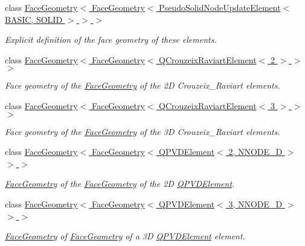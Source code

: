 \begin{DoxyCompactItemize}
\item 
class \hyperlink{classoomph_1_1FaceGeometry_3_01FaceGeometry_3_01PseudoSolidNodeUpdateElement_3_01BASIC_00_01SOLID_01_4_01_4_01_4}{Face\+Geometry$<$ Face\+Geometry$<$ Pseudo\+Solid\+Node\+Update\+Element$<$ B\+A\+S\+I\+C, S\+O\+L\+I\+D $>$ $>$ $>$}
\begin{DoxyCompactList}\small\item\em Explicit definition of the face geometry of these elements. \end{DoxyCompactList}\item 
class \hyperlink{classoomph_1_1FaceGeometry_3_01FaceGeometry_3_01QCrouzeixRaviartElement_3_012_01_4_01_4_01_4}{Face\+Geometry$<$ Face\+Geometry$<$ Q\+Crouzeix\+Raviart\+Element$<$ 2 $>$ $>$ $>$}
\begin{DoxyCompactList}\small\item\em Face geometry of the \hyperlink{classoomph_1_1FaceGeometry}{Face\+Geometry} of the 2D Crouzeix\+\_\+\+Raviart elements. \end{DoxyCompactList}\item 
class \hyperlink{classoomph_1_1FaceGeometry_3_01FaceGeometry_3_01QCrouzeixRaviartElement_3_013_01_4_01_4_01_4}{Face\+Geometry$<$ Face\+Geometry$<$ Q\+Crouzeix\+Raviart\+Element$<$ 3 $>$ $>$ $>$}
\begin{DoxyCompactList}\small\item\em Face geometry of the \hyperlink{classoomph_1_1FaceGeometry}{Face\+Geometry} of the 3D Crouzeix\+\_\+\+Raviart elements. \end{DoxyCompactList}\item 
class \hyperlink{classoomph_1_1FaceGeometry_3_01FaceGeometry_3_01QPVDElement_3_012_00_01NNODE__1D_01_4_01_4_01_4}{Face\+Geometry$<$ Face\+Geometry$<$ Q\+P\+V\+D\+Element$<$ 2, N\+N\+O\+D\+E\+\_\+D $>$ $>$ $>$}
\begin{DoxyCompactList}\small\item\em \hyperlink{classoomph_1_1FaceGeometry}{Face\+Geometry} of the \hyperlink{classoomph_1_1FaceGeometry}{Face\+Geometry} of the 2D \hyperlink{classoomph_1_1QPVDElement}{Q\+P\+V\+D\+Element}. \end{DoxyCompactList}\item 
class \hyperlink{classoomph_1_1FaceGeometry_3_01FaceGeometry_3_01QPVDElement_3_013_00_01NNODE__1D_01_4_01_4_01_4}{Face\+Geometry$<$ Face\+Geometry$<$ Q\+P\+V\+D\+Element$<$ 3, N\+N\+O\+D\+E\+\_\+D $>$ $>$ $>$}
\begin{DoxyCompactList}\small\item\em \hyperlink{classoomph_1_1FaceGeometry}{Face\+Geometry} of \hyperlink{classoomph_1_1FaceGeometry}{Face\+Geometry} of a 3D \hyperlink{classoomph_1_1QPVDElement}{Q\+P\+V\+D\+Element} element. \end{DoxyCompactList}\item 

\end{DoxyCompactItemize}
